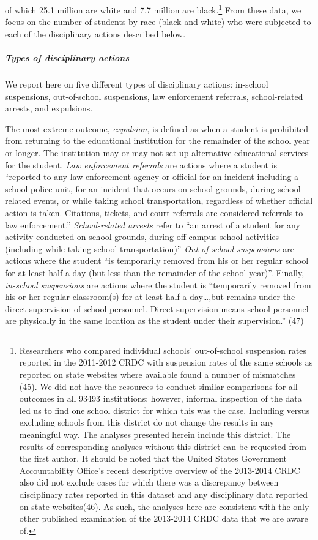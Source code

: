 \documentclass[9pt,twocolumn,twoside,lineno]{pnas-new}
\begin{document}
of which 25.1 million are white and 7.7 million are black.\footnote{Researchers
  who compared individual schools' out-of-school suspension rates
  reported in the 2011-2012 CRDC with suspension rates of the same
  schools as reported on state websites where available found a number
  of mismatches (45). We did not have the resources to conduct similar
  comparisons for all outcomes in all 93493 institutions; however,
  informal inspection of the data led us to find one school district for
  which this was the case. Including versus excluding schools from this
  district do not change the results in any meaningful way. The analyses
  presented herein include this district. The results of corresponding
  analyses without this district can be requested from the first author.
  It should be noted that the United States Government Accountability
  Office's recent descriptive overview of the 2013-2014 CRDC also did
  not exclude cases for which there was a discrepancy between
  disciplinary rates reported in this dataset and any disciplinary data
  reported on state websites(46). As such, the analyses here are
  consistent with the only other published examination of the 2013-2014
  CRDC data that we are aware of.} From these data, we focus on the
number of students by race (black and white) who were subjected to each
of the disciplinary actions described below.

\subparagraph{Types of disciplinary
actions}\label{types-of-disciplinary-actions}

We report here on five different types of disciplinary actions:
in-school suspensions, out-of-school suspensions, law enforcement
referrals, school-related arrests, and expulsions.

The most extreme outcome, \emph{expulsion}, is defined as when a student
is prohibited from returning to the educational institution for the
remainder of the school year or longer. The institution may or may not
set up alternative educational services for the student. \emph{Law
enforcement referrals} are actions where a student is ``reported to any
law enforcement agency or official for an incident including a school
police unit, for an incident that occurs on school grounds, during
school-related events, or while taking school transportation, regardless
of whether official action is taken. Citations, tickets, and court
referrals are considered referrals to law enforcement.''
\emph{School-related arrests} refer to ``an arrest of a student for any
activity conducted on school grounds, during off-campus school
activities (including while taking school transportation)''
\emph{Out-of-school suspensions} are actions where the student ``is
temporarily removed from his or her regular school for at least half a
day (but less than the remainder of the school year)''. Finally,
\emph{in-school suspensions} are actions where the student is
``temporarily removed from his or her regular classroom(s) for at least
half a day\ldots{},but remains under the direct supervision of school
personnel. Direct supervision means school personnel are physically in
the same location as the student under their supervision.'' (47)
\end{document}
